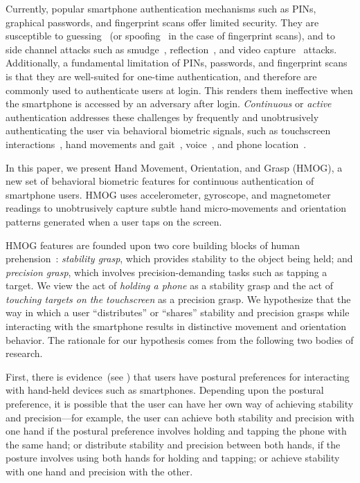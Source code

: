 %
%
%
%
%
%
%
%
%

Currently, popular smartphone authentication mechanisms such as PINs, graphical passwords, and fingerprint scans offer limited security. They are susceptible to guessing~\cite{pin_distribution} (or spoofing~\cite{iphone_fingerprint_spoof} in the case of fingerprint scans), and to side channel attacks such as smudge~\cite{AvivGMBS10}, reflection~\cite{XuH0MF13}, and video capture~\cite{ShuklaKSP14} attacks.
Additionally, a fundamental limitation of PINs, passwords, and fingerprint scans is that they are well-suited for one-time authentication, 
and therefore are commonly used to authenticate users at login. This renders them ineffective when the smartphone is accessed by an adversary after login. {\em Continuous}  {or \em active} authentication addresses these challenges by frequently and unobtrusively authenticating the user via behavioral biometric signals, such as touchscreen interactions~\cite{frank2013}, hand movements and gait~\cite{derawi2010, bo2013}, voice~\cite{LuBPKL11}, and phone location~\cite{shi2010}. 

%

%
%
%
%
%
%
%
%
%
%
%
%
%
%
%
%
%
%
%
%

In this paper, we present Hand Movement, Orientation, and Grasp (HMOG), a new set of behavioral biometric features for continuous authentication of smartphone users. HMOG uses accelerometer, gyroscope, and magnetometer readings to unobtrusively capture subtle hand micro-movements and orientation patterns generated when a user taps on the screen. 
%
%


HMOG features are founded upon two core building blocks of human prehension~\cite{Napier56}: {\em stability grasp}, which provides stability to the object being held; and {\em precision grasp}, which involves precision-demanding tasks such as tapping a target. We view the act of \textit{holding a phone} as a stability grasp and the act of \textit{touching targets on the touchscreen} as a precision grasp. We hypothesize that the way in which a user ``distributes'' or ``shares'' stability and precision grasps while interacting with the smartphone results in distinctive movement and orientation behavior. The rationale for our hypothesis comes from the following two bodies of research.

First, there is evidence~(see \cite{Karlson06,Azenkot2012,Wobbrock2008}) that users have postural preferences for interacting with hand-held devices such as smartphones. Depending upon the postural preference, it is possible that the user can have her own way of achieving stability and precision---for example, the user can achieve both stability and precision with one hand if the postural preference involves holding and tapping the phone with the same hand; or distribute stability and precision between both hands, if the posture involves using both hands for holding and tapping; or achieve stability with one hand and precision with the other. %

